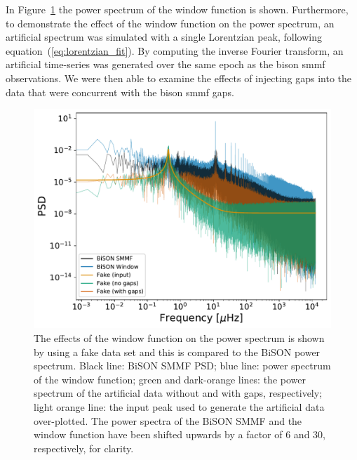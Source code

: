 In Figure~\ref{fig:window_function_PSDs} the power spectrum of the window function is shown. Furthermore, to demonstrate the effect of the window function on the power spectrum, an artificial spectrum was simulated with a single Lorentzian peak, following equation~(\ref{eq:lorentzian_fit}). By computing the inverse Fourier transform, an artificial time-series was generated over the same epoch as the \gls{bison} \gls{smmf} observations. We were then able to examine the effects of injecting gaps into the data that were concurrent with the \gls{bison} \gls{smmf} gaps. 


\begin{figure}[ht!]
	\centering
	\includegraphics[width=\columnwidth]{gap_test.pdf}
	\caption{The effects of the window function on the power spectrum is shown by using a fake data set and this is compared to the BiSON power spectrum. Black line: BiSON SMMF PSD; blue line: power spectrum of the window function; green and dark-orange lines: the power spectrum of the artificial data without and with gaps, respectively; light orange line: the input peak used to generate the artificial data over-plotted. The power spectra of the BiSON SMMF and the window function have been shifted upwards by a factor of 6 and 30, respectively, for clarity.}
	\label{fig:window_function_PSDs}
\end{figure}



